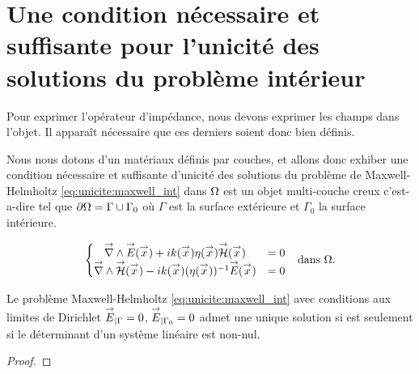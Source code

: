 \section{Une condition nécessaire et suffisante pour l'unicité des solutions du problème intérieur}

Pour exprimer l'opérateur d'impédance, nous devons exprimer les champs dans l'objet. Il apparaît nécessaire que ces derniers soient donc bien définis.

Nous nous dotons d'un matériaux définis par couches, et allons donc exhiber une condition nécessaire et suffisante d'unicité des solutions du problème de Maxwell-Helmholtz  \eqref{eq:unicite:maxwell_int} dans \(\Omega\) est un objet multi-couche creux c'est-a-dire tel que \(\partial \Omega = \Gamma \cup \Gamma_0\) où \(\Gamma\) est la surface extérieure et \(\Gamma_0\) la surface intérieure.

\begin{align}
\left\lbrace
  \begin{matrix}
    {\overset{\rightarrow}{\nabla}}\wedge {\overset{\rightarrow}{E}}({\overset{\rightarrow}{x}}) + i k({\overset{\rightarrow}{x}})\eta({\overset{\rightarrow}{x}}) {\overset{\rightarrow}{\mathcal{H}}}({\overset{\rightarrow}{x}}) &= 0
    \\
    {\overset{\rightarrow}{\nabla}}\wedge {\overset{\rightarrow}{\mathcal{H}}}({\overset{\rightarrow}{x}}) - i k({\overset{\rightarrow}{x}})(\eta({\overset{\rightarrow}{x}}))^{-1} {\overset{\rightarrow}{E}}({\overset{\rightarrow}{x}}) &= 0
  \end{matrix}
  \right. && \text{dans \(\Omega\).}
  \label{eq:unicite:maxwell_int}
\end{align}

\begin{prop}
  Le problème Maxwell-Helmholtz \eqref{eq:unicite:maxwell_int} avec conditions aux limites de Dirichlet \({\overset{\rightarrow}{E}}_{|\Gamma} = 0\), \({\overset{\rightarrow}{E}}_{|\Gamma_0} = 0\) admet une unique solution si est seulement si le déterminant d'un système linéaire est non-nul.
\end{prop}

\begin{proof}
  
\end{proof}